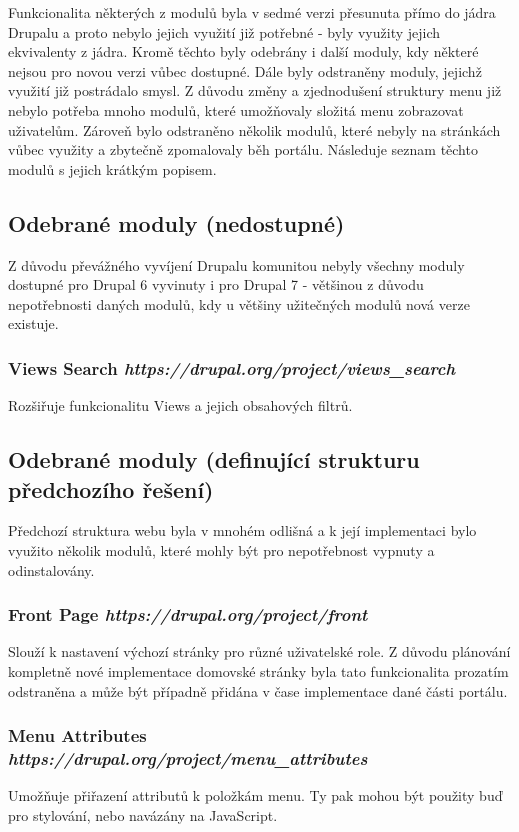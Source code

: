 Funkcionalita některých z modulů byla v sedmé verzi přesunuta přímo do jádra Drupalu a proto nebylo jejich využití již potřebné - byly využity jejich ekvivalenty z jádra. Kromě těchto byly odebrány i další moduly, kdy některé nejsou pro novou verzi vůbec dostupné. Dále byly odstraněny moduly, jejichž využití již postrádalo smysl. Z důvodu změny a zjednodušení struktury menu již nebylo potřeba mnoho modulů, které umožňovaly složitá menu zobrazovat uživatelům. Zároveň bylo odstraněno několik modulů, které nebyly na stránkách vůbec využity a zbytečně zpomalovaly běh portálu. Následuje seznam těchto modulů s jejich krátkým popisem.

\subsection{Odebrané moduly (nedostupné)}
Z důvodu převážného vyvíjení Drupalu komunitou nebyly všechny moduly dostupné pro Drupal 6 vyvinuty i pro Drupal 7 - většinou z důvodu nepotřebnosti daných modulů, kdy u většiny užitečných modulů nová verze existuje.

\subsubsection*{Views Search \hfill \emph{https://drupal.org/project/views\_search}}
Rozšiřuje funkcionalitu Views a jejich obsahových filtrů.

\subsection{Odebrané moduly (definující strukturu předchozího řešení)}
Předchozí struktura webu byla v mnohém odlišná a k její implementaci bylo využito několik modulů, které mohly být pro nepotřebnost vypnuty a odinstalovány. 

\subsubsection*{Front Page \hfill \emph{https://drupal.org/project/front}}
Slouží k nastavení výchozí stránky pro různé uživatelské role. Z důvodu plánování kompletně nové implementace domovské stránky byla tato funkcionalita prozatím odstraněna a může být případně přidána v čase implementace dané části portálu.

\subsubsection*{Menu Attributes \hfill \emph{https://drupal.org/project/menu\_attributes}}
Umožňuje přiřazení attributů k položkám menu. Ty pak mohou být použity buď pro stylování, nebo navázány na JavaScript.

